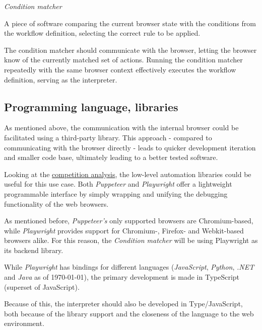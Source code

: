 \emptyline
\textit{Condition matcher}
\smallskip
    
A piece of software comparing the current browser state with the conditions from the workflow definition, selecting the correct rule to be applied.

The condition matcher should communicate with the browser, letting the browser know of the currently matched set of actions. 
Running the condition matcher repeatedly with the same browser context effectively executes the workflow definition, serving as the interpreter.

\subsection{Programming language, libraries}

As mentioned above, the communication with the internal browser could be facilitated using a third-party library. 
This approach - compared to communicating with the browser directly - leads to quicker development iteration and smaller code base, ultimately leading to a better tested software. 

Looking at the \hyperref[competition]{competition analysis}, the low-level automation libraries could be useful for this use case.
Both \textit{Puppeteer} and \textit{Playwright} offer a lightweight programmable interface by simply wrapping and unifying the debugging functionality of the web browsers.

As mentioned before, \textit{Puppeteer's} only supported browsers are Chromium-based, while \textit{Playwright} provides support for Chromium-, Firefox- and Webkit-based browsers alike.
For this reason, the \textit{Condition matcher} will be using Playwright as its backend library.

While \textit{Playwright} has bindings for different languages (\textit{JavaScript}, \textit{Python}, \textit{.NET} and \textit{Java} as of \today), the primary development is made in TypeScript (superset of JavaScript).

Because of this, the interpreter should also be developed in Type/JavaScript, both because of the library support and the closeness of the language to the web environment.